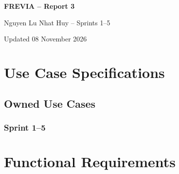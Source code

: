 \documentclass[12pt,a4paper]{article}
\begin{document}
\begin{center}\Large\textbf{FREVIA -- Report 3}\par\large Nguyen Lu Nhat Huy -- Sprints 1--5\par\normalsize Updated 08 November 2026\end{center}
\tableofcontents
\newpage
\section{Use Case Specifications}
\subsection{Owned Use Cases}
\subsubsection{Sprint 1--5}







\section{Functional Requirements}






\end{document}

